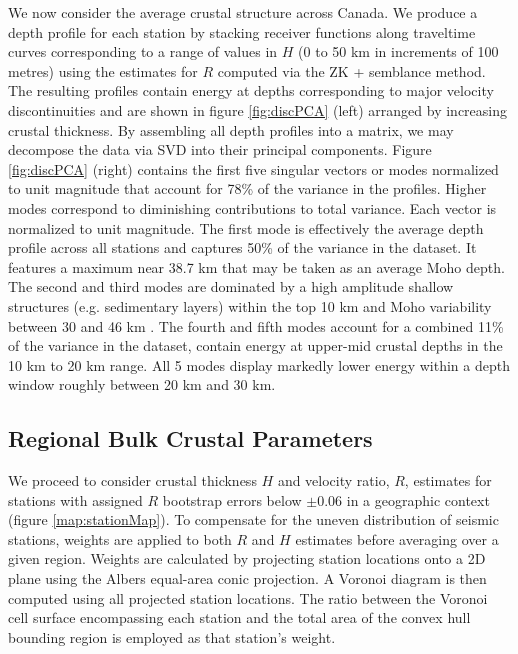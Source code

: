 \documentclass[review]{elsarticle}
\begin{document}
We now consider the average crustal structure across Canada. We produce a depth profile for each station by stacking receiver functions along traveltime curves corresponding to a range of values in $H$ (0 to 50 km in increments of 100 metres) using the estimates for $R$ computed via the ZK + semblance method. The resulting profiles contain energy at depths corresponding to major velocity discontinuities and are shown in figure \ref{fig:discPCA} (left) arranged by increasing crustal thickness. By assembling all depth profiles into a matrix, we may decompose the data via SVD into their principal components. Figure \ref{fig:discPCA} (right) contains the first five singular vectors or modes normalized to unit magnitude that account for 78\% of the variance in the profiles. Higher modes correspond to diminishing contributions to total variance. Each vector is normalized to unit magnitude. The first mode is effectively the average depth profile across all stations and captures 50\% of the variance in the dataset. It features a maximum near 38.7 km that may be taken as an average Moho depth. The second and third modes are dominated by a high amplitude shallow structures (e.g. sedimentary layers) within the top 10 km and Moho variability between 30 and 46 km . The fourth and fifth modes account for a combined 11\% of the variance in the dataset, contain energy at upper-mid crustal depths in the 10 km to 20 km range. All 5 modes display markedly lower energy within a depth window roughly between 20 km and 30 km.



\subsection{Regional Bulk Crustal Parameters}

We proceed to consider crustal thickness $H$ and velocity ratio, $R$, estimates for stations with assigned $R$ bootstrap errors below $\pm 0.06$ in a geographic context (figure \ref{map:stationMap}). To compensate for the uneven distribution of seismic stations, weights are applied to both $R$ and $H$ estimates before averaging over a given region. Weights are calculated by projecting station locations onto a 2D plane using the Albers equal-area conic projection. A Voronoi diagram is then computed using all projected station locations. The ratio between the Voronoi cell surface encompassing each station and the total area of the convex hull bounding region is employed as that station's weight.
\end{document}
